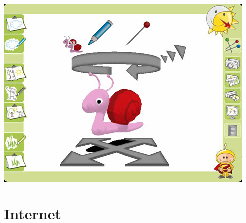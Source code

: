 \documentclass[notumble]{leaflet}
\begin{document}
\stImplementationDefinition

\pagebreak{}

\section{\stApplicationsTerm}

\stApplicationsDefinition

\begin{center}
  \includegraphics[width=.5\textwidth]{plopp}\\
  \stPloppDrawingSessionTerm
\end{center}

\begin{stGlossary}
\end{stGlossary}

\pagebreak{}

\section{\stBooksTerm}

\stBooksDefinition

\section{\stSmalltalkActionsTerm}

\stSmalltalkActionsDefinition

\section{Internet}

\stInternetWebsitesDefinition

\stAfterAnyText
\end{document}
